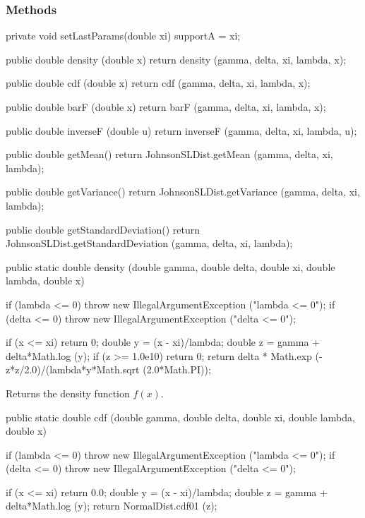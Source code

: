 \subsubsection* {Methods}
\begin{hide}
\begin{code}

   private void setLastParams(double xi) {
      supportA = xi;
   }

   public double density (double x) {
      return density (gamma, delta, xi, lambda, x);
   }

   public double cdf (double x) {
      return cdf (gamma, delta, xi, lambda, x);
   }

   public double barF (double x) {
      return barF (gamma, delta, xi, lambda, x);
   }

   public double inverseF (double u){
      return inverseF (gamma, delta, xi, lambda, u);
   }

   public double getMean() {
      return JohnsonSLDist.getMean (gamma, delta, xi, lambda);
   }

   public double getVariance() {
      return JohnsonSLDist.getVariance (gamma, delta, xi, lambda);
   }

   public double getStandardDeviation() {
      return JohnsonSLDist.getStandardDeviation (gamma, delta, xi, lambda);
   }
\end{code}
\end{hide}\begin{code}

   public static double density (double gamma, double delta,
                                 double xi, double lambda, double x)\begin{hide} {
      if (lambda <= 0)
         throw new IllegalArgumentException ("lambda <= 0");
      if (delta <= 0)
         throw new IllegalArgumentException ("delta <= 0");

      if (x <= xi)
         return 0;
      double y = (x - xi)/lambda;
      double z = gamma + delta*Math.log (y);
      if (z >= 1.0e10)
         return 0;
      return delta * Math.exp (-z*z/2.0)/(lambda*y*Math.sqrt (2.0*Math.PI));
   }\end{hide}
\end{code}
\begin{tabb} Returns the density function $f(x)$.
\end{tabb}
\begin{code}

   public static double cdf (double gamma, double delta,
                             double xi, double lambda, double x)\begin{hide} {
      if (lambda <= 0)
         throw new IllegalArgumentException ("lambda <= 0");
      if (delta <= 0)
         throw new IllegalArgumentException ("delta <= 0");

      if (x <= xi)
         return 0.0;
      double y = (x - xi)/lambda;
      double z = gamma + delta*Math.log (y);
      return NormalDist.cdf01 (z);
   }\end{hide}
\end{code}

